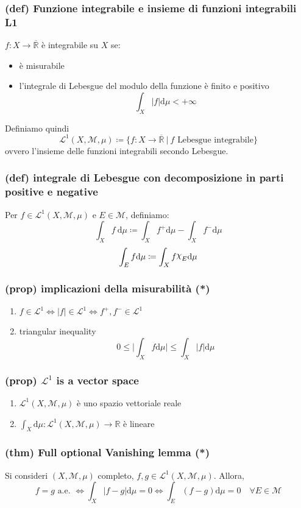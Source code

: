\subsubsection{(def) Funzione integrabile e insieme di funzioni integrabili L1}
$f:X\to \overline{\mathbb R}$ è integrabile su $X$ se:
\begin{itemize}
    \item è misurabile
    \item l'integrale di Lebesgue del modulo della funzione è finito e positivo$$\int_X\vert f\vert \mathrm d\mu <+\infty$$
\end{itemize}
Definiamo quindi
$$\mathcal L^1(X,\mathcal M,\mu)\coloneqq\{f:X\to \overline{\mathbb R}\ |\  f \text{ Lebesgue integrabile}\}$$ 
ovvero l'insieme delle funzioni integrabili secondo Lebesgue.
\subsubsection{(def) integrale di Lebesgue con decomposizione in parti positive e negative}
Per $f\in \mathcal L^1(X,\mathcal M,\mu)$ e $E\in \mathcal M$, definiamo:
$$\int_X f\ \mathrm{d}\mu\coloneqq \int_X f^+\mathrm d\mu-\int_X f^-\mathrm d\mu$$
$$\int_E f\mathrm d\mu \coloneqq \int_X f\rchi_E \mathrm d\mu$$
\subsubsection{(prop) implicazioni della misurabilità (*)}
\begin{enumerate}[label=\roman*]
    \item $f\in \mathcal L^1 \iff |f|\in \mathcal L^1 \iff f^+,f^-\in \mathcal L^1$
    \item triangular inequality $$0\leq \Big\vert\int_X f \mathrm d\mu\Big|\leq \int_X|f|\mathrm d\mu$$
\end{enumerate}
\subsubsection{(prop) $\mathcal L^1$ is a vector space}
\begin{enumerate}
    \item $\mathcal L^1(X,\mathcal M,\mu)$ è uno spazio vettoriale reale
    \item $\int_X \mathrm d\mu:\mathcal L^1(X,\mathcal M,\mu)\to \mathbb R$ è lineare
\end{enumerate}
\subsubsection{(thm) Full optional Vanishing lemma (*)}
Si consideri $(X,\mathcal M,\mu)$ completo, $f,g\in \mathcal L^1(X,\mathcal M,\mu)$.
Allora, $$f=g \text{ a.e. }\iff \int_X |f-g|\mathrm d\mu =0\iff \int_E(f-g)\mathrm d\mu=0\quad \forall E\in \mathcal M$$
